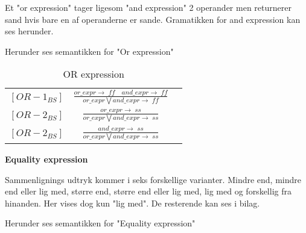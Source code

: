 \noindent Et "or expression" tager ligesom "and expression" 2 operander men returnerer sand hvis bare en af operanderne er sande. Gramatikken for and expression kan ses herunder.


\noindent Herunder ses semantikken for "Or expression"

    \bgroup
    \def\arraystretch{3}
    \begin{table}[H]
    \centering
    \begin{tabular}{l c l}
        
        $[OR-1_{BS}]$ &$\frac{or\_expr \rightarrow \; ff \quad and\_expr \rightarrow \; ff}{or\_expr \bigvee and\_expr \rightarrow \; ff}$ & \\
    
        $[OR-2_{BS}]$ &$\frac{or\_expr \rightarrow \; ss}{or\_expr \bigvee and\_expr \rightarrow \; ss}$ &\\
        
        $[OR-2_{BS}]$ &$\frac{and\_expr \rightarrow \; ss}{or\_expr \bigvee and\_expr \rightarrow \; ss}$ &\\
        
    \end{tabular}
    \caption{OR expression}
    \label{tab:orExpr}
    \end{table}
    \egroup
\noindent\textbf{Equality expression}

\noindent\noindent Sammenlignings udtryk kommer i seks forskellige varianter. Mindre end, mindre end eller lig med, større end, større end eller lig med, lig med og forskellig fra hinanden. Her vises dog kun "lig med". De resterende kan ses i bilag.
    
    
    \noindent Herunder ses semantikken for "Equality expression"

